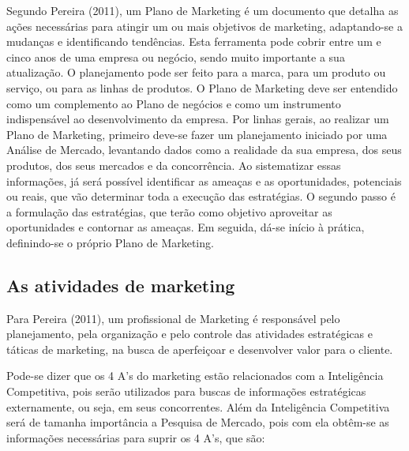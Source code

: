 \documentclass[
	12pt,				%
	openright,			%
	oneside,			%
	a4paper,			%
	english,			%
	french,				%
	spanish,			%
	brazil				%
	]{abntex2}
\begin{document}
	Segundo Pereira (2011), um Plano de Marketing é um documento que detalha as ações necessárias para atingir um ou mais objetivos de marketing, adaptando-se a mudanças e identificando tendências. Esta ferramenta pode cobrir entre um e cinco anos de uma empresa ou negócio, sendo muito importante a sua atualização. O planejamento pode ser feito para a marca, para um produto ou serviço, ou para as linhas de produtos. O Plano de Marketing deve ser entendido como um complemento ao Plano de negócios e como um instrumento indispensável ao desenvolvimento da empresa. Por linhas gerais, ao realizar um Plano de Marketing, primeiro deve-se fazer um planejamento iniciado por uma Análise de Mercado, levantando dados como a realidade da sua empresa, dos seus produtos, dos seus mercados e da concorrência. Ao sistematizar essas informações, já será possível identificar as ameaças e as oportunidades, potenciais ou reais, que vão determinar toda a execução das estratégias. O segundo passo é a formulação das estratégias, que terão como objetivo aproveitar as oportunidades e contornar as ameaças. Em seguida, dá-se início à prática, definindo-se o próprio Plano de Marketing.
	
\subsection[As atividades de marketing]{As atividades de marketing}

	Para Pereira (2011), um profissional de Marketing é responsável pelo planejamento, pela organização e pelo controle das atividades estratégicas e táticas de marketing, na busca de aperfeiçoar e desenvolver valor para o cliente.
	
	Pode-se dizer que os 4 A’s do marketing estão relacionados com a Inteligência Competitiva, pois serão utilizados para buscas de informações estratégicas externamente, ou seja, em seus concorrentes. Além da Inteligência Competitiva será de tamanha importância a Pesquisa de Mercado, pois com ela obtêm-se as informações necessárias para suprir os 4 A’s, que são:
	
\end{document}
